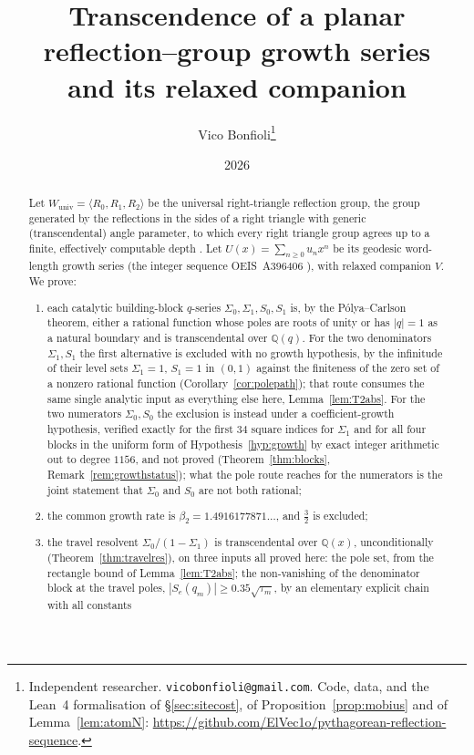 \documentclass[11pt]{article}
\title{Transcendence of a planar reflection--group growth series\\ and its relaxed companion}
\author{Vico Bonfioli\thanks{Independent researcher. \texttt{vicobonfioli@gmail.com}.
Code, data, and the Lean~4 formalisation of \S\ref{sec:sitecost}, of
Proposition~\ref{prop:mobius} and of Lemma~\ref{lem:atomN}:
\url{https://github.com/ElVec1o/pythagorean-reflection-sequence}.}}
\date{2026}
\theoremstyle{plain}
\theoremstyle{definition}
\theoremstyle{remark}
\newcommand{\Q}{\mathbb{Q}}
\begin{document}
\maketitle

\begin{abstract}
\noindent Let $W_{\mathrm{univ}}=\langle R_0,R_1,R_2\rangle$ be the universal right-triangle
reflection group, the group generated by the reflections in the sides of a right triangle with
generic (transcendental) angle parameter, to which every right triangle group agrees up to a finite,
effectively computable depth \cite{Bonfioli2026a}. Let $U(x)=\sum_{n\ge0}u_nx^n$ be its geodesic
word-length growth series (the integer sequence \textup{OEIS~A396406} \cite{OEIS}), with
relaxed companion $V$. We prove:
\begin{enumerate}[leftmargin=1.9em,itemsep=0.12em,topsep=0.25em]
\item[\textup{(i)}] each catalytic building-block $q$-series $\Sigma_0,\Sigma_1,S_0,S_1$ is, by the
P\'olya--Carlson theorem, either a rational function whose poles are roots of unity or has
$|q|=1$ as a natural boundary and is transcendental over $\Q(q)$. For the two denominators
$\Sigma_1,S_1$ the first alternative is excluded with no growth hypothesis, by the infinitude of
their level sets $\Sigma_1=1$, $S_1=1$ in $(0,1)$ against the finiteness of the zero set of a
nonzero rational function (Corollary~\ref{cor:polepath}); that route consumes the same single
analytic input as everything else here, Lemma~\ref{lem:T2abs}. For the two numerators
$\Sigma_0,S_0$ the exclusion is instead under a coefficient-growth hypothesis, verified exactly for
the first $34$ square indices for $\Sigma_1$ and for all four blocks in the uniform form of
Hypothesis~\ref{hyp:growth} by exact integer arithmetic out to degree $1156$, and not proved
(Theorem~\ref{thm:blocks}, Remark~\ref{rem:growthstatus}); what the pole route reaches for the
numerators is the joint statement that $\Sigma_0$ and $S_0$ are not both rational;
\item[\textup{(ii)}] the common growth rate is $\beta_2=1.4916177871\ldots$, and
$\tfrac32$ is excluded;
\item[\textup{(iii)}] the travel resolvent $\Sigma_0/(1-\Sigma_1)$ is transcendental over $\Q(x)$,
unconditionally (Theorem~\ref{thm:travelres}), on three inputs all proved here: the pole set, from
the rectangle bound of Lemma~\ref{lem:T2abs}; the non-vanishing of the denominator block at the
travel poles, $|S_e(q_m)|\ge0.35\sqrt{\tau_m}$, by an elementary explicit chain with all constants

\end{enumerate}
\end{abstract}
\end{document}
